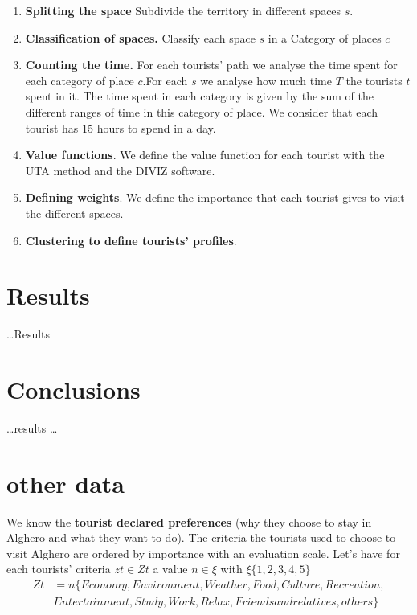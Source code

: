\documentclass[version=last, pagesize, twoside=semi, DIV=calc, 12pt, a4paper, french, english]{scrartcl}
\begin{document}
\begin{enumerate}
\item \textbf{Splitting the space} Subdivide the territory in different spaces $s$.
\item \textbf{Classification of spaces.} Classify each space $s$ in a Category of places $c$
\item \textbf{Counting the time.} For each tourists' path we analyse the time spent for each category of place $c$.For each $s$ we analyse how much time $T$ the tourists $t$ spent in it. The time spent in each category is given by the  sum of the different ranges of time in this category of place. We consider that each tourist has 15 hours to spend in a day.
\item \textbf{Value functions}. We define the value function for each tourist with the UTA method and the DIVIZ software.
\item \textbf{Defining weights}. We define the importance that each tourist gives to visit the different spaces.
\item \textbf{Clustering to define tourists' profiles}.

\end{enumerate}


\section{Results}
\dots Results

\section{Conclusions}
\dots results \dots


\section{other data}
We know the \textbf{tourist declared preferences} (why they choose to stay in Alghero and what they want to do). The criteria the tourists used to choose to visit Alghero are ordered by importance with an evaluation scale. Let's have for each tourists' criteria $zt \in Zt$ a value $n \in \xi$ with $\xi\{1,2,3,4,5\}$
\begin{equation}
\begin{split}
Zt&=n\{Economy,Environment,Weather,Food,Culture,Recreation,\\
&Entertainment,Study,Work,Relax,Friends and relatives,others\}
\end{split}
\end{equation}
\end{document}
